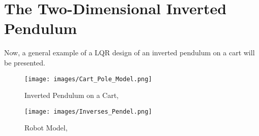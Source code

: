 \documentclass[paper=a4, pagesize, DIV=calc, BCOR=12.5mm, twoside=on, onecolumn=on, open = any, titlepage =on, parskip =half-, headsepline = on, footsepline = on, chapterprefix = on, appendixprefix = off, fontsize = 12pt, numbers = noenddot, abstract = on]{scrbook}
\numberwithin{equation}{chapter}
\theoremstyle{definition}
\theoremstyle{plain}
\theoremstyle{plain}
\theoremstyle{remark}
\theoremstyle{plain}
\theoremstyle{plain}
\begin{document}
\section{The Two-Dimensional Inverted Pendulum}
Now, a general example of a LQR design of an inverted pendulum on a cart will be presented.
\begin{figure}[htbp]
\centering
\begin{minipage}[b]{7cm}
\centering
\texttt{[image: images/Cart\_Pole\_Model.png]}
\caption{Inverted Pendulum on a Cart, \cite[p.2]{tou}}
\label{fig:inverted pendulum}
\end{minipage}
\begin{minipage}[b]{7.2cm}
\centering
\texttt{[image: images/Inverses\_Pendel.png]} 
\caption{Robot Model, \cite[p.87]{kajita:2007}}
\label{fig:inv robot mod}
\end{minipage}
\end{figure}
\end{document}
